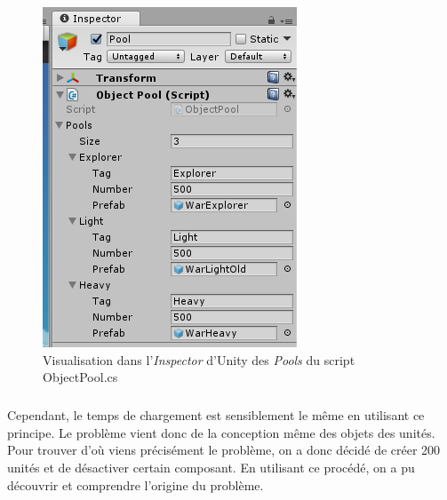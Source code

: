 \documentclass{report}
\begin{document}
\begin{figure}[!h]
\centering
\includegraphics{ObjectPoolingImage}
\caption{Visualisation dans l'\textit{Inspector} d'Unity des \textit{Pools} du script ObjectPool.cs}
\end{figure}

\subparagraph{} Cependant, le temps de chargement est sensiblement le même en utilisant ce principe. Le problème vient donc de la conception même des objets des unités. \newline
Pour trouver d’où viens précisément le problème, on a donc décidé de créer 200 unités et de désactiver certain composant. En utilisant ce procédé, on a pu découvrir et comprendre l'origine du problème.
\end{document}
